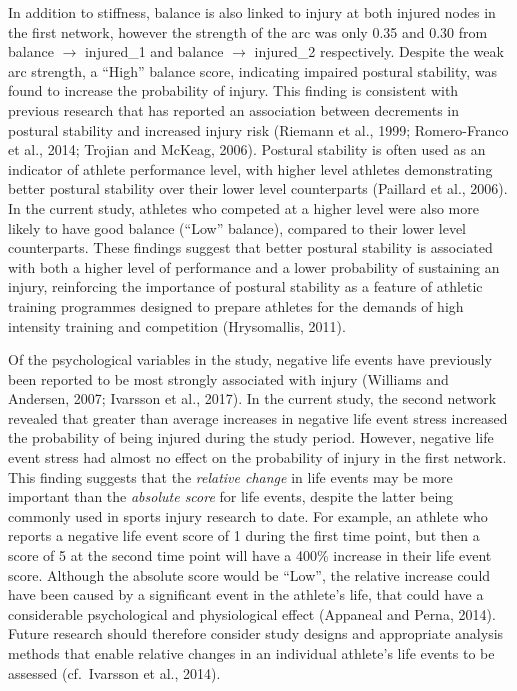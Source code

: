 \documentclass[
]{frontiersHLTH}
\begin{document}
In addition to stiffness, balance is also linked to injury at both
injured nodes in the first network, however the strength of the arc was
only 0.35 and 0.30 from balance \(\rightarrow\) injured\_1 and balance
\(\rightarrow\) injured\_2 respectively. Despite the weak arc strength,
a ``High'' balance score, indicating impaired postural stability, was
found to increase the probability of injury. This finding is consistent
with previous research that has reported an association between
decrements in postural stability and increased injury risk (Riemann et
al., 1999; Romero-Franco et al., 2014; Trojian and McKeag, 2006).
Postural stability is often used as an indicator of athlete performance
level, with higher level athletes demonstrating better postural
stability over their lower level counterparts (Paillard et al., 2006).
In the current study, athletes who competed at a higher level were also
more likely to have good balance (``Low'' balance), compared to their
lower level counterparts. These findings suggest that better postural
stability is associated with both a higher level of performance and a
lower probability of sustaining an injury, reinforcing the importance of
postural stability as a feature of athletic training programmes designed
to prepare athletes for the demands of high intensity training and
competition (Hrysomallis, 2011).

Of the psychological variables in the study, negative life events have
previously been reported to be most strongly associated with injury
(Williams and Andersen, 2007; Ivarsson et al., 2017). In the current
study, the second network revealed that greater than average increases
in negative life event stress increased the probability of being injured
during the study period. However, negative life event stress had almost
no effect on the probability of injury in the first network. This
finding suggests that the \emph{relative change} in life events may be
more important than the \emph{absolute score} for life events, despite
the latter being commonly used in sports injury research to date. For
example, an athlete who reports a negative life event score of 1 during
the first time point, but then a score of 5 at the second time point
will have a 400\% increase in their life event score. Although the
absolute score would be ``Low'', the relative increase could have been
caused by a significant event in the athlete's life, that could have a
considerable psychological and physiological effect (Appaneal and Perna,
2014). Future research should therefore consider study designs and
appropriate analysis methods that enable relative changes in an
individual athlete's life events to be assessed (cf.~Ivarsson et al.,
2014).
\end{document}

